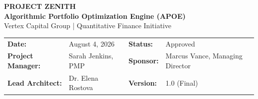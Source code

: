 \documentclass[11pt,table,letterpaper]{article}
\begin{document}
\thispagestyle{plain}

\begin{tcolorbox}[
  enhanced,
  colback=primary,
  colframe=primary,
  arc=0mm,
  halign=center,
  top=25pt,
  bottom=25pt,
  colupper=white
]
  {\Huge\sffamily\bfseries PROJECT ZENITH}\\[8pt]
  {\Large\sffamily\bfseries Algorithmic Portfolio Optimization Engine (APOE)}\\[12pt]
  {\large\sffamily Vertex Capital Group \quad | \quad Quantitative Finance Initiative}
\end{tcolorbox}

\vspace{15pt}

\begin{tcolorbox}[
  colback=bglight,
  colframe=bordercolor,
  arc=2mm,
  boxrule=1pt,
  left=12pt,
  right=12pt,
  top=10pt,
  bottom=10pt
]
  \sffamily
  \begin{tabularx}{\textwidth}{l L l L}
    \textbf{Date:} & August 4, 2026 & \textbf{Status:} & Approved \\
    \textbf{Project Manager:} & Sarah Jenkins, PMP & \textbf{Sponsor:} & Marcus Vance, Managing Director \\
    \textbf{Lead Architect:} & Dr. Elena Rostova & \textbf{Version:} & 1.0 (Final) \\
  \end{tabularx}
\end{tcolorbox}

\vspace{10pt}







\newpage
\nocite{*}
\printbibliography
\end{document}
